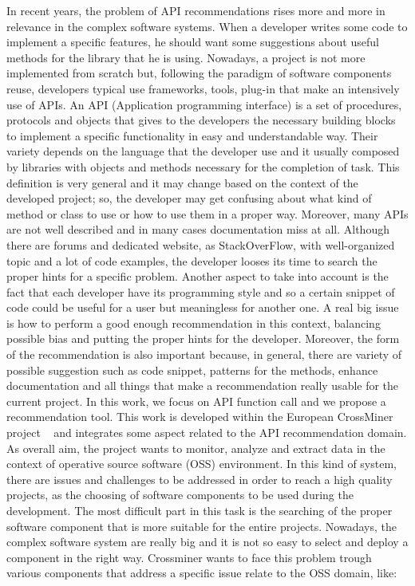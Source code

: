 

In recent years, the problem of API recommendations rises more and more in relevance in the complex software systems. When a developer writes some code to implement a specific features, he should want some suggestions about useful methods for the library that he is using. Nowadays, a project is not more implemented from scratch but, following the paradigm of software components reuse, developers typical use frameworks, tools, plug-in that make an intensively use of APIs. An API (Application programming interface) is a set of procedures, protocols and objects that gives to the developers the necessary building blocks to implement a specific functionality in easy and understandable way. Their variety depends on the language that the developer use and it usually composed by libraries with objects and methods necessary for the completion of task. This definition is very general and it may change based on the context of the developed project; so, the developer may get confusing about what kind of method or class to use or how to use them in a proper way. Moreover, many APIs are not well described and in many cases documentation miss at all. Although there are forums and dedicated website, as StackOverFlow, with well-organized topic and a lot of code examples, the developer looses its time to search the proper hints for a specific problem. Another aspect to take into account is the fact that each developer have its programming style and so a certain snippet of code could be useful for a user but meaningless for another one. 
\newline
A real big issue is how to perform a good enough recommendation in this context, balancing possible bias and putting the proper hints for the developer. Moreover, the form of the recommendation is also important because, in general, there are variety of possible suggestion such as code snippet, patterns for the methods, enhance documentation and all things that make a recommendation really usable for the current project. In this work, we focus on API function call and we propose a recommendation tool. This work is developed within the European CrossMiner project  ~\cite{https://www.crossminer.org/_nodate} and integrates some aspect related to the API recommendation domain. As overall aim, the project wants to monitor, analyze and extract data in the context of operative source software (OSS) environment. In this kind of system, there are issues and challenges to be addressed in order to reach a high quality projects, as the choosing of software components to be used during the development. The most difficult part in this task is the searching of the proper software component that is more suitable for the entire projects. Nowadays, the complex software system are really big and it is not so easy to select and deploy a component in the right way. Crossminer wants to face this problem trough various components that address a specific issue relate to the OSS domain, like:
